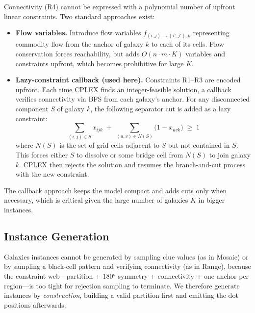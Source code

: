 Connectivity (R4) cannot be expressed with a polynomial number of upfront linear constraints. Two standard approaches exist:

\begin{itemize}
  \item \textbf{Flow variables.} Introduce flow variables $f_{(i,j)\to(i',j'),k}$ representing commodity flow from the anchor of galaxy $k$ to each of its cells. Flow conservation forces reachability, but adds $O(n\cdot m\cdot K)$ variables and constraints upfront, which becomes prohibitive for large $K$.

  \item \textbf{Lazy-constraint callback (used here).} Constraints R1--R3 are encoded upfront. Each time CPLEX finds an integer-feasible solution, a callback verifies connectivity via BFS from each galaxy's anchor. For any disconnected component $S$ of galaxy $k$, the following separator cut is added as a lazy constraint:
  \[
    \sum_{(i,j)\in S} x_{ijk}
    \;+\;
    \sum_{(u,v)\in N(S)} \bigl(1 - x_{uvk}\bigr)
    \;\geq\;
    1
  \]
  where $N(S)$ is the set of grid cells adjacent to $S$ but not contained in $S$. This forces either $S$ to dissolve or some bridge cell from $N(S)$ to join galaxy $k$. CPLEX then rejects the solution and resumes the branch-and-cut process with the new constraint.
\end{itemize}

The callback approach keeps the model compact and adds cuts only when necessary, which is critical given the large number of galaxies $K$ in bigger instances.

\subsection{Instance Generation}

Galaxies instances cannot be generated by sampling clue values (as in Mosaic) or by sampling a black-cell pattern and verifying connectivity (as in Range), because the constraint web---partition + 180° symmetry + connectivity + one anchor per region---is too tight for rejection sampling to terminate. We therefore generate instances by \emph{construction}, building a valid partition first and emitting the dot positions afterwards.

